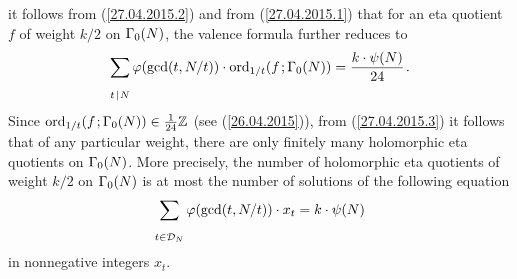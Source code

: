 \documentclass[a4paper,11pt]{amsart}
\begin{document}
it follows from  (\ref{27.04.2015.2})
and from 
 (\ref{27.04.2015.1}) that for an eta quotient $f$ of weight $k/2$ on $\Gamma_0(N)$, the valence formula
 further reduces to
\begin{equation}
\sum_{{\substack{\ \\\ \\ t\hspace{.5pt}\idi N}}} %
\varphi(\gcd(t,N/t))\cdot\ord_{1/t}(f\hspace{1pt};\GN) 
=\frac{k\cdot\psi(N)}{24}\hspace{1pt}.
\label{27.04.2015.3}
\end{equation}
Since $\operatorname{ord}_{1/t}(f\hspace{1pt};\Gamma_0(N))\in\frac{1}{24}\mathbb{Z}$ (see (\ref{26.04.2015})), from
(\ref{27.04.2015.3}) it follows that of any particular weight, there are only finitely many holomorphic eta quotients
on $\Gamma_0(N)$. More precisely, the number of holomorphic eta quotients of weight $k/2$
on $\Gamma_0(N)$ is at most the number of solutions of the following equation
\begin{equation}
 \sum_{\substack{\ \\\ \\t\in\mathcal{D}_N}}{\varphi(\gcd(t,N/t))}\cdot x_t=k\cdot\psi(N)
\label{27.04.2015.3Z}\end{equation}
in nonnegative integers $x_t$. 
\end{document}
